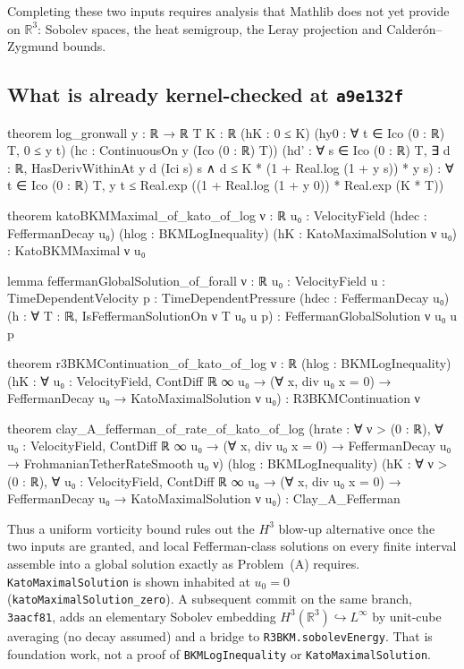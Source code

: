 \documentclass[11pt,a4paper]{article}
\theoremstyle{definition}
\theoremstyle{remark}
\newcommand{\R}{\mathbb{R}}
\newcommand{\lean}[1]{\texttt{#1}}
\begin{document}
\noindent Completing these two inputs requires analysis that Mathlib does not yet provide on $\R^3$: Sobolev spaces, the heat semigroup, the Leray projection and Calderón--Zygmund bounds.

\subsection{What is already kernel-checked at \texttt{a9e132f}}
\begin{leancode}
theorem log_gronwall {y : ℝ → ℝ} {T K : ℝ} (hK : 0 ≤ K)
    (hy0 : ∀ t ∈ Ico (0 : ℝ) T, 0 ≤ y t) (hc : ContinuousOn y (Ico (0 : ℝ) T))
    (hd' : ∀ s ∈ Ico (0 : ℝ) T, ∃ d : ℝ, HasDerivWithinAt y d (Ici s) s ∧
      d ≤ K * (1 + Real.log (1 + y s)) * y s) :
    ∀ t ∈ Ico (0 : ℝ) T,
      y t ≤ Real.exp ((1 + Real.log (1 + y 0)) * Real.exp (K * T))

theorem katoBKMMaximal_of_kato_of_log {ν : ℝ} {u₀ : VelocityField}
    (hdec : FeffermanDecay u₀)
    (hlog : BKMLogInequality) (hK : KatoMaximalSolution ν u₀) :
    KatoBKMMaximal ν u₀

lemma feffermanGlobalSolution_of_forall {ν : ℝ} {u₀ : VelocityField}
    {u : TimeDependentVelocity} {p : TimeDependentPressure}
    (hdec : FeffermanDecay u₀)
    (h : ∀ T : ℝ, IsFeffermanSolutionOn ν T u₀ u p) :
    FeffermanGlobalSolution ν u₀ u p

theorem r3BKMContinuation_of_kato_of_log {ν : ℝ} (hlog : BKMLogInequality)
    (hK : ∀ u₀ : VelocityField, ContDiff ℝ ∞ u₀ → (∀ x, div u₀ x = 0) →
      FeffermanDecay u₀ → KatoMaximalSolution ν u₀) :
    R3BKMContinuation ν

theorem clay_A_fefferman_of_rate_of_kato_of_log
    (hrate : ∀ ν > (0 : ℝ), ∀ u₀ : VelocityField, ContDiff ℝ ∞ u₀ →
      (∀ x, div u₀ x = 0) → FeffermanDecay u₀ → FrohmanianTetherRateSmooth u₀ ν)
    (hlog : BKMLogInequality)
    (hK : ∀ ν > (0 : ℝ), ∀ u₀ : VelocityField, ContDiff ℝ ∞ u₀ →
      (∀ x, div u₀ x = 0) → FeffermanDecay u₀ → KatoMaximalSolution ν u₀) :
    Clay_A_Fefferman
\end{leancode}

\noindent Thus a uniform vorticity bound rules out the $H^3$ blow-up alternative once the two inputs are granted, and local Fefferman-class solutions on every finite interval assemble into a global solution exactly as Problem~(A) requires. \lean{KatoMaximalSolution} is shown inhabited at $u_0=0$ (\lean{katoMaximalSolution\_zero}). A subsequent commit on the same branch, \lean{3aacf81}, adds an elementary Sobolev embedding $H^3(\R^3)\hookrightarrow L^\infty$ by unit-cube averaging (no decay assumed) and a bridge to \lean{R3BKM.sobolevEnergy}. That is foundation work, not a proof of \lean{BKMLogInequality} or \lean{KatoMaximalSolution}.
\end{document}
